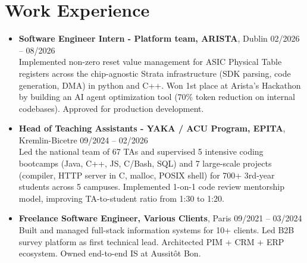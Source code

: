 \documentclass[9pt,a4paper]{article}
\begin{document}
\section*{Work Experience}
\begin{tcolorbox}[mybox]
\begin{itemize}
\item\textbf{Software Engineer Intern - Platform team, ARISTA}, Dublin \hfill {\small02/2026 – 08/2026}\\[0.5em]
\textcolor{gray!40!black}{Implemented non-zero reset value management for ASIC Physical Table registers across the chip-agnostic Strata infrastructure (SDK parsing, code generation, DMA) in python and C++.
Won 1st place at Arista's Hackathon by building an AI agent optimization tool (70\% token reduction on internal codebases). Approved for production development.}

\item\textbf{Head of Teaching Assistants - YAKA / ACU Program, EPITA}, Kremlin-Bicetre \hfill {\small09/2024 – 02/2026}\\[0.5em]
\textcolor{gray!40!black}{Led the national team of 67 TAs and supervised 5 intensive coding bootcamps (Java, C++, JS, C/Bash, SQL) and 7 large-scale projects (compiler, HTTP server in C, malloc, POSIX shell) for 700+ 3rd-year students across 5 campuses. Implemented 1-on-1 code review mentorship model, improving TA-to-student ratio from 1:30 to 1:20.}

\item\textbf{Freelance Software Engineer, Various Clients}, Paris \hfill {\small09/2021 – 03/2024}\\[0.5em]
\textcolor{gray!40!black}{Built and managed full-stack information systems for 10+ clients. Led B2B survey platform  as first technical lead. Architected PIM + CRM + ERP ecosystem. Owned end-to-end IS at Aussitôt Bon.}
\end{itemize}
\end{tcolorbox}
\end{document}
